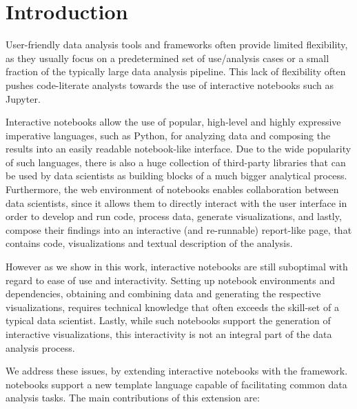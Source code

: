 \section{Introduction}
\label{section:introduction}

User-friendly data analysis tools and frameworks often provide limited flexibility, as they usually focus on a predetermined set of use/analysis cases or a small fraction of the typically large data analysis pipeline. This lack of flexibility often pushes code-literate analysts towards the use of interactive notebooks such as Jupyter.

Interactive notebooks allow the use of popular, high-level and highly expressive imperative languages, such as Python, for analyzing data and composing the results into an easily readable notebook-like interface. Due to the wide popularity of such languages, there is also a huge collection of third-party libraries that can be used by data scientists as building blocks of a much bigger analytical process. Furthermore, the web environment of notebooks enables collaboration between data scientists, since it allows them to directly interact with the user interface in order to develop and run code, process data, generate visualizations, and lastly, compose their findings into an interactive (and re-runnable) report-like page, that contains code, visualizations and textual description of the analysis.

However as we show in this work, interactive notebooks are still suboptimal with regard to ease of use and interactivity. Setting up notebook environments and dependencies, obtaining and combining data and generating the respective visualizations, requires technical knowledge that often exceeds the skill-set of a typical data scientist. Lastly, while such notebooks support the generation of interactive visualizations, this interactivity is not an integral part of the data analysis process. 

We address these issues, by extending interactive notebooks with the  {\projname} framework. {\projname} notebooks support a new template language capable of facilitating common data analysis tasks. The main contributions of this extension are:

